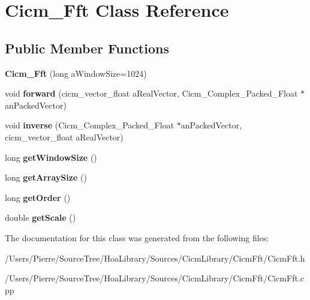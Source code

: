 \hypertarget{class_cicm___fft}{\section{Cicm\-\_\-\-Fft Class Reference}
\label{class_cicm___fft}
}
\subsection*{Public Member Functions}
\begin{DoxyCompactItemize}
\item 
\hypertarget{class_cicm___fft_afe777a718830ab1f22119dcf6bfd1d58}{{\bfseries Cicm\-\_\-\-Fft} (long a\-Window\-Size=1024)}\label{class_cicm___fft_afe777a718830ab1f22119dcf6bfd1d58}

\item 
\hypertarget{class_cicm___fft_a78a6d1be775360a93ee63b99f7ee56cf}{void {\bfseries forward} (cicm\-\_\-vector\-\_\-float a\-Real\-Vector, Cicm\-\_\-\-Complex\-\_\-\-Packed\-\_\-\-Float $\ast$an\-Packed\-Vector)}\label{class_cicm___fft_a78a6d1be775360a93ee63b99f7ee56cf}

\item 
\hypertarget{class_cicm___fft_a3791358b85f2e7a591f7ea87a2882aa0}{void {\bfseries inverse} (Cicm\-\_\-\-Complex\-\_\-\-Packed\-\_\-\-Float $\ast$an\-Packed\-Vector, cicm\-\_\-vector\-\_\-float a\-Real\-Vector)}\label{class_cicm___fft_a3791358b85f2e7a591f7ea87a2882aa0}

\item 
\hypertarget{class_cicm___fft_ae86da3b4c424610d26c2cf36df9a6220}{long {\bfseries get\-Window\-Size} ()}\label{class_cicm___fft_ae86da3b4c424610d26c2cf36df9a6220}

\item 
\hypertarget{class_cicm___fft_a14bbb8e19dc6167254517a78e9baf377}{long {\bfseries get\-Array\-Size} ()}\label{class_cicm___fft_a14bbb8e19dc6167254517a78e9baf377}

\item 
\hypertarget{class_cicm___fft_a3567e8d6ec10f2e02e1bc7763bf4b8bb}{long {\bfseries get\-Order} ()}\label{class_cicm___fft_a3567e8d6ec10f2e02e1bc7763bf4b8bb}

\item 
\hypertarget{class_cicm___fft_a4f102798396e36cacd47b37795c3b07b}{double {\bfseries get\-Scale} ()}\label{class_cicm___fft_a4f102798396e36cacd47b37795c3b07b}

\end{DoxyCompactItemize}


The documentation for this class was generated from the following files\-:\begin{DoxyCompactItemize}
\item 
/\-Users/\-Pierre/\-Source\-Tree/\-Hoa\-Library/\-Sources/\-Cicm\-Library/\-Cicm\-Fft/Cicm\-Fft.\-h\item 
/\-Users/\-Pierre/\-Source\-Tree/\-Hoa\-Library/\-Sources/\-Cicm\-Library/\-Cicm\-Fft/Cicm\-Fft.\-cpp\end{DoxyCompactItemize}
